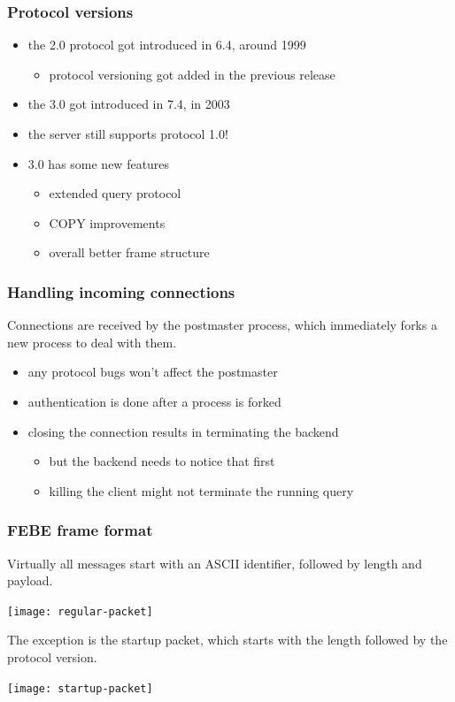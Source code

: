 \documentclass{beamer}
\begin{document}
\begin{frame}
  \frametitle{Protocol versions}

  \begin{itemize}
  \item the 2.0 protocol got introduced in 6.4, around 1999
    \begin{itemize}
    \item protocol versioning got added in the previous release
    \end{itemize}
  \item the 3.0 got introduced in 7.4, in 2003
  \item the server \alert{still supports} protocol 1.0!
  \item 3.0 has some new features
    \begin{itemize}
    \item extended query protocol
    \item COPY improvements
    \item overall better frame structure
    \end{itemize}
  \end{itemize}
\end{frame}

\begin{frame}
  \frametitle{Handling incoming connections}

  Connections are received by the postmaster process, which immediately forks a
  new process to deal with them.

  \begin{itemize}
  \item any \alert{protocol bugs} won't affect the postmaster
  \item authentication is done \alert{after} a process is forked
  \item closing the connection results in \alert{terminating} the backend
    \begin{itemize}
    \item but the backend needs to notice that first
    \item killing the client might not terminate the running query
    \end{itemize}
  \end{itemize}
\end{frame}

\begin{frame}
  \frametitle{FEBE frame format}

  Virtually all messages start with an ASCII identifier, followed by length and
  payload.

  \begin{center}
    \texttt{[image: regular-packet]}
  \end{center}

  The exception is the startup packet, which starts with the length followed by
  the protocol version.

  \begin{center}
    \texttt{[image: startup-packet]}
  \end{center}

\end{frame}
\end{document}

